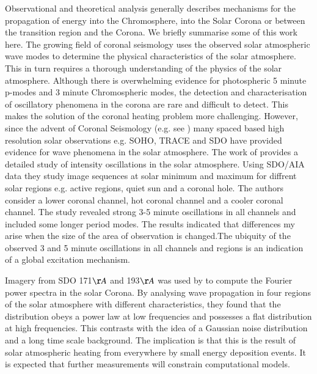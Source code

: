 \documentclass[authoryear,final,1p]{elsarticle}
\begin{document}
Observational and theoretical analysis generally describes mechanisms for the propagation of energy into the Chromosphere, into the Solar Corona or between the transition region and the Corona. We briefly summarise some of this work here. The growing field of coronal seismology uses the observed solar atmospheric wave modes to determine the physical characteristics of the solar atmosphere. This in turn requires a thorough understanding of the physics of the solar atmosphere. Although there is overwhelming evidence for photospheric 5 minute p-modes and 3 minute Chromospheric modes, the detection and characterisation of oscillatory phenomena in the corona are rare and difficult to detect. This makes the solution of the coronal heating problem more challenging. However, since the advent of Coronal Seismology (e.g. see \citet{Roberts1984} \citet{DeMoortel2005}) many spaced based high resolution solar observations e.g. SOHO, TRACE and SDO have provided evidence for wave phenomena in the solar atmosphere.
The work of \citet{Erdelyi2015} provides a detailed study of intensity oscillations in the solar atmosphere. Using SDO/AIA data they study image sequences at solar minimum and maximum for diffrent solar regions e.g. active regions, quiet sun and a coronal hole. The authors consider a lower coronal channel, hot coronal channel and a cooler coronal channel. The study revealed strong 3-5 minute oscillations in all channels and included some longer period modes. The results indicated that differences my arise when the size of the area of observation is changed.The ubiquity of the observed 3 and 5 minute oscillations in all channels and regions is an indication of a global excitation mechanism.

 Imagery from SDO 171$\AA$ and 193$\AA$ was used by \citet{Ireland2014} to compute the Fourier power spectra in the solar Corona. By analysing wave propagation in four regions of the solar atmosphere with different characteristics, they found that the distribution obeys a power law at low frequencies and possesses a flat distribution at high frequencies. This contrasts with the idea of a Gaussian noise distribution and a long time scale background. The implication is that this is the result of solar atmospheric heating from everywhere by small energy deposition events. It is expected that further measurements will constrain computational models. 
\end{document}
